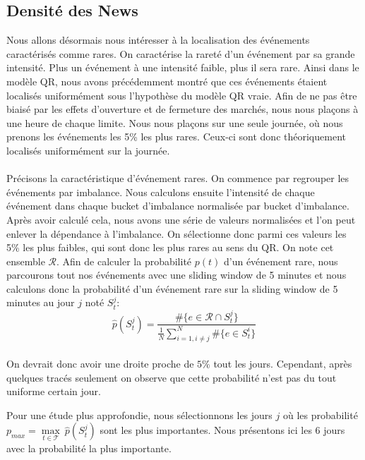 \documentclass[12pt,a4paper]{article}
\theoremstyle{definition}
\theoremstyle{remark}
\begin{document}
\subsection{Densité des News}
Nous allons désormais nous intéresser à la localisation des événements caractérisés comme rares. On caractérise la rareté d'un événement par sa grande intensité. Plus un événement à une intensité faible, plus il sera rare. Ainsi dans le modèle QR, nous avons précédemment montré que ces événements étaient localisés uniformément sous l'hypothèse du modèle QR vraie. Afin de ne pas être biaisé par les effets d'ouverture et de fermeture des marchés, nous nous plaçons à une heure de chaque limite. Nous nous plaçons sur une seule journée, où nous prenons les événements les 5\% les plus rares. Ceux-ci sont donc théoriquement localisés uniformément sur la journée.
\\
\\
Précisons la caractéristique d'événement rares. On commence par regrouper les événements par imbalance. Nous calculons ensuite l'intensité de chaque événement dans chaque bucket d'imbalance normalisée par bucket d'imbalance. Après avoir calculé cela, 
nous avons une série de valeurs normalisées et l'on peut enlever la dépendance à l'imbalance. On sélectionne donc parmi ces valeurs les 5\% les plus faibles, qui sont donc les plus rares au sens du QR. On note cet ensemble $\mathcal{R}$. Afin de calculer la probabilité $p(t)$ d'un événement rare, nous parcourons tout nos événements avec une sliding window de 5 minutes et nous calculons donc la probabilité d'un événement rare sur la sliding window de 5 minutes au jour $j$ noté $S_t^j$:
\\
$$\hat{p}(S_t^j) = \frac{\#\{e\in \mathcal{R}\cap S_t^j\}}{\frac{1}{N}\sum_{i=1,i\neq j}^N\#\{e\in S_t^i\}}$$
\\
On devrait donc avoir une droite proche de $5\%$ tout les jours. Cependant, après quelques tracés seulement on observe que cette probabilité n'est pas du tout uniforme certain jour.

Pour une étude plus approfondie, nous sélectionnons les jours $j$ où les probabilité $p_{max} = \underset{t\in \mathcal{T}}{\max}\ \hat{p}(S_t^j)$ sont les plus importantes.  Nous présentons ici les 6 jours avec la probabilité la plus importante.
\end{document}

